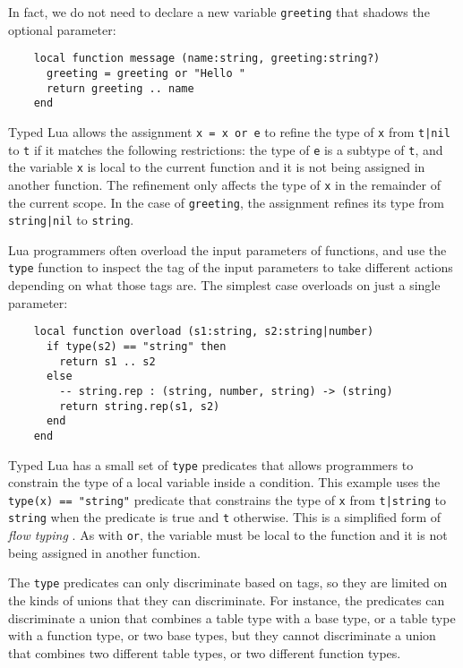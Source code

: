 In fact, we do not need to declare a new variable \texttt{greeting} that
shadows the optional parameter:
\begin{verbatim}
    local function message (name:string, greeting:string?)
      greeting = greeting or "Hello "
      return greeting .. name
    end
\end{verbatim}

Typed Lua allows the assignment \texttt{x = x or e} to refine
the type of \texttt{x} from \texttt{t|nil} to \texttt{t}
if it matches the following restrictions: 
the type of \texttt{e} is a subtype of \texttt{t},
and the variable \texttt{x} is local to the current function
and it is not being assigned in another function.
The refinement only affects the type of \texttt{x} in the remainder
of the current scope.
In the case of \texttt{greeting}, the assignment refines its type
from \texttt{string|nil} to \texttt{string}. 

Lua programmers often overload the input parameters of functions,
and use the \texttt{type} function to inspect the tag of the
input parameters to take different actions depending on what
those tags are.
The simplest case overloads on just a single parameter:
\begin{verbatim}
    local function overload (s1:string, s2:string|number)
      if type(s2) == "string" then
        return s1 .. s2
      else
        -- string.rep : (string, number, string) -> (string)
        return string.rep(s1, s2)
      end
    end
\end{verbatim}

Typed Lua has a small set of \texttt{type} predicates that allows
programmers to constrain the type of a local variable inside a condition.
This example uses the \texttt{type(x) == "string"} predicate that
constrains the type of \texttt{x} from \texttt{t|string} to
\texttt{string} when the predicate is true and \texttt{t} otherwise.
This is a simplified form of \emph{flow typing} \citep{guha2011tlc,tobin-hochstadt2010ltu}.
As with \texttt{or}, the variable must be local to the function
and it is not being assigned in another function.

The \texttt{type} predicates can only discriminate based on tags,
so they are limited on the kinds of unions that they can discriminate.
For instance, the predicates can discriminate a union that combines
a table type with a base type, or a table type with a function type,
or two base types, but they cannot discriminate a union that combines
two different table types, or two different function types.

